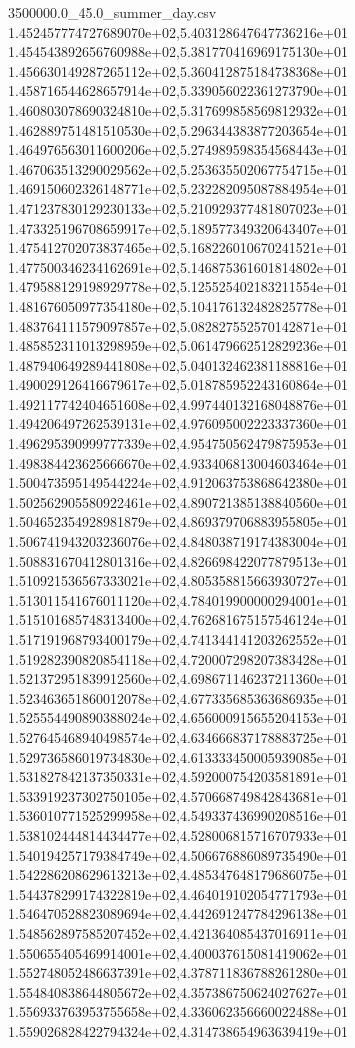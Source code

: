 \begin{filecontents*}{3500000.0_45.0_summer_day.csv}
1.452457774727689070e+02,5.403128647647736216e+01
1.454543892656760988e+02,5.381770416969175130e+01
1.456630149287265112e+02,5.360412875184738368e+01
1.458716544628657914e+02,5.339056022361273790e+01
1.460803078690324810e+02,5.317699858569812932e+01
1.462889751481510530e+02,5.296344383877203654e+01
1.464976563011600206e+02,5.274989598354568443e+01
1.467063513290029562e+02,5.253635502067754715e+01
1.469150602326148771e+02,5.232282095087884954e+01
1.471237830129230133e+02,5.210929377481807023e+01
1.473325196708659917e+02,5.189577349320643407e+01
1.475412702073837465e+02,5.168226010670241521e+01
1.477500346234162691e+02,5.146875361601814802e+01
1.479588129198929778e+02,5.125525402183211554e+01
1.481676050977354180e+02,5.104176132482825778e+01
1.483764111579097857e+02,5.082827552570142871e+01
1.485852311013298959e+02,5.061479662512829236e+01
1.487940649289441808e+02,5.040132462381188816e+01
1.490029126416679617e+02,5.018785952243160864e+01
1.492117742404651608e+02,4.997440132168048876e+01
1.494206497262539131e+02,4.976095002223337360e+01
1.496295390999777339e+02,4.954750562479875953e+01
1.498384423625666670e+02,4.933406813004603464e+01
1.500473595149544224e+02,4.912063753868642380e+01
1.502562905580922461e+02,4.890721385138840560e+01
1.504652354928981879e+02,4.869379706883955805e+01
1.506741943203236076e+02,4.848038719174383004e+01
1.508831670412801316e+02,4.826698422077879513e+01
1.510921536567333021e+02,4.805358815663930727e+01
1.513011541676011120e+02,4.784019900000294001e+01
1.515101685748313400e+02,4.762681675157546124e+01
1.517191968793400179e+02,4.741344141203262552e+01
1.519282390820854118e+02,4.720007298207383428e+01
1.521372951839912560e+02,4.698671146237211360e+01
1.523463651860012078e+02,4.677335685363686935e+01
1.525554490890388024e+02,4.656000915655204153e+01
1.527645468940498574e+02,4.634666837178883725e+01
1.529736586019734830e+02,4.613333450005939085e+01
1.531827842137350331e+02,4.592000754203581891e+01
1.533919237302750105e+02,4.570668749842843681e+01
1.536010771525299958e+02,4.549337436990208516e+01
1.538102444814434477e+02,4.528006815716707933e+01
1.540194257179384749e+02,4.506676886089735490e+01
1.542286208629613213e+02,4.485347648179686075e+01
1.544378299174322819e+02,4.464019102054771793e+01
1.546470528823089694e+02,4.442691247784296138e+01
1.548562897585207452e+02,4.421364085437016911e+01
1.550655405469914001e+02,4.400037615081419062e+01
1.552748052486637391e+02,4.378711836788261280e+01
1.554840838644805672e+02,4.357386750624027627e+01
1.556933763953755658e+02,4.336062356660022488e+01
1.559026828422794324e+02,4.314738654963639419e+01

\end{filecontents*}
